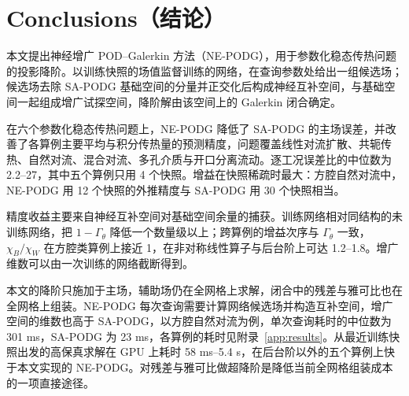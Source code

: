 \section{Conclusions（结论）}
\label{sec:conclusions}

本文提出神经增广 POD–Galerkin 方法（NE-PODG），用于参数化稳态传热问题的投影降阶。以训练快照的场值监督训练的网络，在查询参数处给出一组候选场；候选场去除 SA-PODG 基础空间的分量并正交化后构成神经互补空间，与基础空间一起组成增广试探空间，降阶解由该空间上的 Galerkin 闭合确定。

在六个参数化稳态传热问题上，NE-PODG 降低了 SA-PODG 的主场误差，并改善了各算例主要平均与积分传热量的预测精度，问题覆盖线性对流扩散、共轭传热、自然对流、混合对流、多孔介质与开口分离流动。逐工况误差比的中位数为 2.2--27，其中五个算例只用 4 个快照。增益在快照稀疏时最大：方腔自然对流中，NE-PODG 用 12 个快照的外推精度与 SA-PODG 用 30 个快照相当。

精度收益主要来自神经互补空间对基础空间余量的捕获。训练网络相对同结构的未训练网络，把 $1-\Gamma_\theta$ 降低一个数量级以上；跨算例的增益次序与 $\Gamma_\theta$ 一致，$\chi_B/\chi_W$ 在方腔类算例上接近 1，在非对称线性算子与后台阶上可达 1.2--1.8。增广维数可以由一次训练的网络截断得到。

本文的降阶只施加于主场，辅助场仍在全网格上求解，闭合中的残差与雅可比也在全网格上组装。NE-PODG 每次查询需要计算网络候选场并构造互补空间，增广空间的维数也高于 SA-PODG，以方腔自然对流为例，单次查询耗时的中位数为 301 ms，SA-PODG 为 23 ms，各算例的耗时见附录~\ref{app:results}。从最近训练快照出发的高保真求解在 GPU 上耗时 58 ms--5.4 s，在后台阶以外的五个算例上快于本文实现的 NE-PODG。对残差与雅可比做超降阶是降低当前全网格组装成本的一项直接途径。
